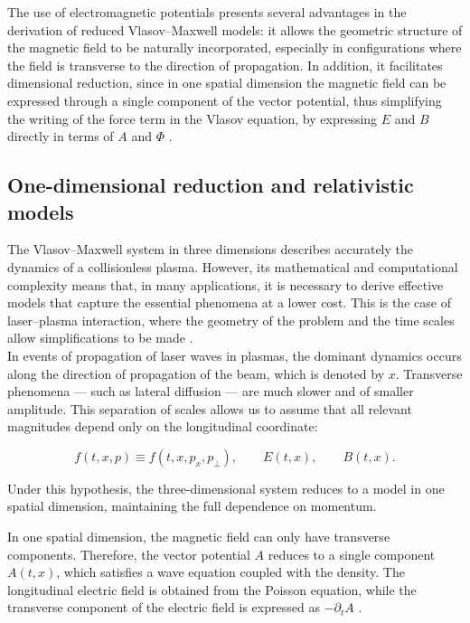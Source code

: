 \documentclass[11pt,a4paper,twoside,pdf]{article}
\numberwithin{equation}{section}
\begin{document}
The use of electromagnetic potentials presents several advantages in the derivation of
reduced Vlasov--Maxwell models: it allows the geometric structure of the magnetic field to be naturally incorporated, especially in configurations where the field is transverse to
the direction of propagation. In addition, it facilitates dimensional reduction, since in one spatial dimension the magnetic field can be expressed through a single component of the vector potential, thus simplifying the writing of the force term in the Vlasov equation, by expressing $E$ and $B$ directly in terms of $A$ and $\Phi$ \cite{carrillo2006global}.








\subsection{One-dimensional reduction and relativistic models}

The Vlasov--Maxwell system in three dimensions describes accurately the
dynamics of a collisionless plasma. However, its mathematical and
computational complexity means that, in many applications, it is necessary to derive
effective models that capture the essential phenomena at a lower cost. This is
the case of laser--plasma interaction, where the geometry of the problem and the
time scales allow simplifications to be made \cite{ghizzo1990vlasov}.\\



In events of propagation of laser waves in plasmas, the dominant
dynamics occurs along the direction of propagation of the beam, which is denoted by $x$. Transverse phenomena --- such as lateral diffusion --- are much slower and of smaller amplitude. This separation of
scales allows us to assume that all relevant magnitudes depend only
on the longitudinal coordinate:


\[
f(t,x,p) \equiv f(t,x,p_x,p_\perp), \qquad
E(t,x), \qquad B(t,x).
\]


Under this hypothesis, the three-dimensional system reduces to a model in one spatial
dimension, maintaining the full dependence on momentum.



In one spatial dimension, the magnetic field can only have transverse
components. Therefore, the vector potential $A$ reduces to a single component
$A(t,x)$, which satisfies a wave equation coupled with the density.
The longitudinal electric field is obtained from the Poisson equation, while
the transverse component of the electric field is expressed as $-\partial_t A$ \cite{martin2021campo}.\\
\end{document}
